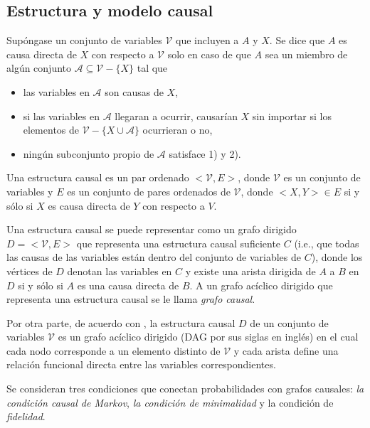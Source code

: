 \subsection{Estructura y modelo causal}

Supóngase un conjunto de variables $\mathcal{V}$ que incluyen a $A$ y $X$. 
Se dice que $A$ es causa directa de $X$ con respecto a $\mathcal{V}$
solo en caso de que $A$ sea un miembro de algún conjunto 
$\mathcal{A} \subseteq \mathcal{V} - \{X\}$ tal que 

\begin{itemize}
    \item las variables en $\mathcal{A}$ son causas de $X$,
    \item si las variables en $\mathcal{A}$ llegaran a ocurrir,
    causarían $X$ sin importar si los elementos de $\mathcal{V} - \{X \cup \mathcal{A}\}$ ocurrieran o no,
    \item ningún subconjunto propio de $\mathcal{A}$ satisface
    1) y 2).
\end{itemize}

Una estructura causal es un par ordenado $<\mathcal{V}, E>$, donde
$\mathcal{V}$ es un conjunto de variables y $E$ es un conjunto
de pares ordenados de $\mathcal{V}$, donde $<X, Y> \in E$ si
y sólo si $X$ es causa directa de $Y$ con respecto a $V$\cite{spirtes2000causation}.

Una estructura causal se puede representar como un grafo
dirigido $D = <\mathcal{V},E>$ que representa una estructura causal suficiente $C$ (i.e., que todas las causas de las variables están dentro del conjunto de variables de $C$), donde los vértices de $D$ denotan las variables en $C$ y existe una
arista dirigida de $A$ a $B$ en $D$ si y sólo si $A$ es
una causa directa de $B$.
A un grafo acíclico dirigido que representa una estructura causal se le llama \textit{grafo causal}.

Por otra parte, de acuerdo con \cite{pearl_2009}, la estructura causal $D$ de un conjunto de variables $\mathcal{V}$ es un grafo acíclico dirigido (DAG por sus siglas en inglés) en el cual cada nodo corresponde a un elemento distinto de $\mathcal{V}$ y cada arista define una relación funcional directa entre las
variables correspondientes. 


Se consideran tres condiciones que conectan probabilidades con
grafos causales: \textit{la condición causal de Markov}, \textit{la condición de minimalidad} y la condición
de \textit{fidelidad}.

